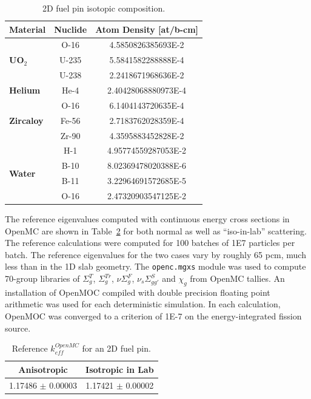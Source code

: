\begin{table}[h!]
  \centering
  \caption{2D fuel pin isotopic composition.}
  \label{table:chap2-pin-isotopes} 
  \vspace{14pt}
  \begin{tabular}{l c c}
  \toprule
  \multicolumn{1}{c}{\bf Material} &
  \multicolumn{1}{c}{\bf Nuclide} &
  \multicolumn{1}{c}{\bf Atom Density [at/b-cm]} \\
  \midrule
  \multirow{3}{*}{\bf UO$_2$} & O-16 &  4.5850826385693E-2 \\
  & U-235 & 5.5841582288888E-4 \\
  & U-238 & 2.2418671968636E-2 \\
  \midrule
  \multirow{1}{*}{\bf Helium} & He-4 & 2.40428068880973E-4 \\
  \midrule
  \multirow{3}{*}{\bf Zircaloy} & O-16 &  6.1404143720635E-4 \\
  & Fe-56 & 2.7183762028359E-4 \\
  & Zr-90 & 4.3595883452828E-2 \\
  \midrule
  \multirow{4}{*}{\bf Water} & H-1 &  4.95774559287053E-2 \\
  & B-10 & 8.02369478020388E-6 \\
  & B-11 & 3.22964691572685E-5 \\
  & O-16 & 2.47320903547125E-2 \\
  \bottomrule
\end{tabular}
\end{table}

The reference eigenvalues computed with continuous energy cross sections in OpenMC are shown in Table~\ref{table:chap2-pin-reference} for both normal as well as ``iso-in-lab'' scattering. The reference calculations were computed for 100 batches of 1E7 particles per batch. The reference eigenvalues for the two cases vary by roughly 65 pcm, much less than in the 1D slab geometry. The \texttt{openc.mgxs} module was used to compute 70-group libraries of $\Sigma^T_g$, $\Sigma^{Tr}_g$, $\nu\Sigma^F_g$, $\nu_s\Sigma^S_{gg'}$ and $\chi_g$ from OpenMC tallies. An installation of OpenMOC compiled with double precision floating point arithmetic was used for each deterministic simulation. In each calculation, OpenMOC was converged to a criterion of 1E-7 on the energy-integrated fission source.

\begin{table}[h!]
  \centering
  \caption{Reference $k^{OpenMC}_{eff}$ for an 2D fuel pin.}
  \label{table:chap2-pin-reference} 
  \vspace{14pt}
  \begin{tabular}{c c}
  \toprule
  \multicolumn{1}{c}{\bf Anisotropic} &
  \multicolumn{1}{c}{\bf Isotropic in Lab} \\
  \midrule
  1.17486 $\pm$ 0.00003 & 1.17421 $\pm$ 0.00002 \\
  \bottomrule
\end{tabular}
\end{table}

